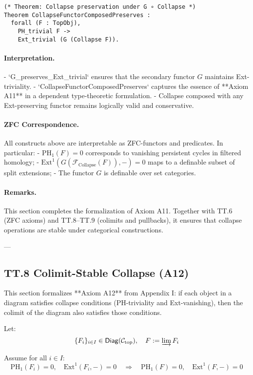 \documentclass[11pt]{article}
\begin{document}
{\begin{lstlisting}[language=Coq]
(* Theorem: Collapse preservation under G ∘ Collapse *)
Theorem CollapseFunctorComposedPreserves :
  forall (F : TopObj),
    PH_trivial F ->
    Ext_trivial (G (Collapse F)).
\end{lstlisting}

\paragraph{Interpretation.}
- `G_preserves_Ext_trivial` ensures that the secondary functor \( G \) maintains Ext-triviality.
- `CollapseFunctorComposedPreserves` captures the essence of **Axiom A11** in a dependent type-theoretic formulation.
- Collapse composed with any Ext-preserving functor remains logically valid and conservative.

\paragraph{ZFC Correspondence.}
All constructs above are interpretable as ZFC-functors and predicates.  
In particular:
- \( \mathrm{PH}_1(F) = 0 \) corresponds to vanishing persistent cycles in filtered homology;
- \( \mathrm{Ext}^1(G(\mathcal{F}_{\mathrm{Collapse}}(F)), -) = 0 \) maps to a definable subset of split extensions;
- The functor \( G \) is definable over set categories.

\paragraph{Remarks.}
This section completes the formalization of Axiom A11.  
Together with TT.6 (ZFC axioms) and TT.8–TT.9 (colimits and pullbacks), it ensures that collapse operations are stable under categorical constructions.

---

\subsection*{TT.8 Colimit-Stable Collapse (A12)}

This section formalizes **Axiom A12** from Appendix I:  
if each object in a diagram satisfies collapse conditions (PH-triviality and Ext-vanishing),  
then the colimit of the diagram also satisfies those conditions.

Let:
\[
\{ F_i \}_{i \in I} \in \mathsf{Diag}(\mathcal{C}_{\mathrm{top}}), \quad
F := \varinjlim F_i
\]

Assume for all \( i \in I \):
\[
\mathrm{PH}_1(F_i) = 0, \quad \mathrm{Ext}^1(F_i, -) = 0
\quad \Rightarrow \quad
\mathrm{PH}_1(F) = 0, \quad \mathrm{Ext}^1(F, -) = 0
\]

}
\end{document}
